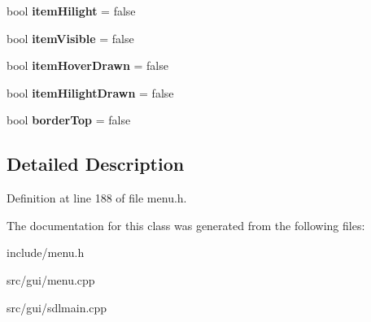 \begin{DoxyCompactItemize}
\item 
\hypertarget{classDOSBoxMenu_1_1item_a2b8eab8d5482b72838f3282c902ebfe2}{bool {\bfseries item\-Hilight} = false}\label{classDOSBoxMenu_1_1item_a2b8eab8d5482b72838f3282c902ebfe2}

\item 
\hypertarget{classDOSBoxMenu_1_1item_a2c014c3c82d5539dcb01c81adac12bee}{bool {\bfseries item\-Visible} = false}\label{classDOSBoxMenu_1_1item_a2c014c3c82d5539dcb01c81adac12bee}

\item 
\hypertarget{classDOSBoxMenu_1_1item_ad9fe38869405c7ca5e31a5198e8fbeee}{bool {\bfseries item\-Hover\-Drawn} = false}\label{classDOSBoxMenu_1_1item_ad9fe38869405c7ca5e31a5198e8fbeee}

\item 
\hypertarget{classDOSBoxMenu_1_1item_a76e2a9b158c97e92b4e381b03b961c8b}{bool {\bfseries item\-Hilight\-Drawn} = false}\label{classDOSBoxMenu_1_1item_a76e2a9b158c97e92b4e381b03b961c8b}

\item 
\hypertarget{classDOSBoxMenu_1_1item_a67eac7d4b03df9509fd907343577c6c5}{bool {\bfseries border\-Top} = false}\label{classDOSBoxMenu_1_1item_a67eac7d4b03df9509fd907343577c6c5}

\end{DoxyCompactItemize}


\subsection{Detailed Description}


Definition at line 188 of file menu.\-h.



The documentation for this class was generated from the following files\-:\begin{DoxyCompactItemize}
\item 
include/menu.\-h\item 
src/gui/menu.\-cpp\item 
src/gui/sdlmain.\-cpp\end{DoxyCompactItemize}
